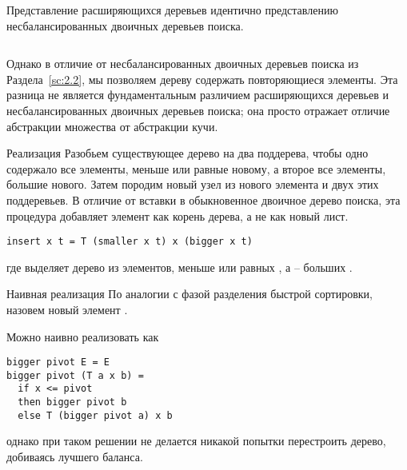 \begin{frame}[fragile]{}
Представление расширяющихся деревьев идентично представлению
несбалансированных двоичных деревьев поиска.
\inputminted[firstline=5,lastline=5] {haskell}{code/SplayHeap.lhs}


Однако в отличие от несбалансированных двоичных деревьев поиска из
Раздела~\ref{sc:2.2}, мы позволяем дереву содержать повторяющиеся
элементы. Эта разница не является фундаментальным различием расширяющихся
деревьев и несбалансированных двоичных деревьев поиска; она просто
отражает отличие абстракции множества от абстракции кучи.

\end{frame}


\begin{frame}[fragile]{Реализация  }
Разобьем существующее дерево на два поддерева, чтобы одно содержало все
элементы, меньше или равные новому, а второе все элементы, большие
нового. Затем породим новый узел из нового элемента и двух этих
поддеревьев. В отличие от вставки в обыкновенное двоичное дерево
поиска, эта процедура добавляет элемент как корень дерева, а не как
новый лист.

\begin{verbatim}
insert x t = T (smaller x t) x (bigger x t)
\end{verbatim}

где  выделяет дерево из элементов, меньше или равных
, а  -- больших
. 

\end{frame}


\begin{frame}[fragile]{Наивная реализация }
По аналогии с фазой разделения быстрой сортировки,
назовем новый элемент .

Можно наивно реализовать  как

\begin{verbatim}
bigger pivot E = E
bigger pivot (T a x b) =
  if x <= pivot 
  then bigger pivot b
  else T (bigger pivot a) x b
\end{verbatim}
однако при таком решении не делается никакой попытки перестроить
дерево, добиваясь лучшего баланса.
\end{frame}

